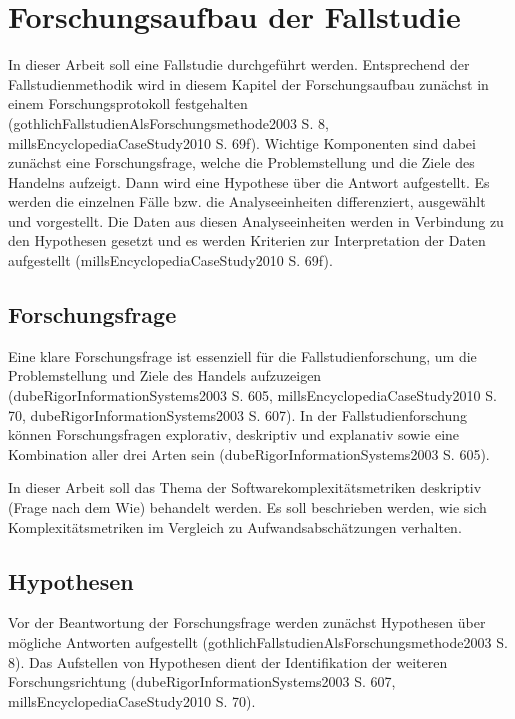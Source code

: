 \chapter{Forschungsaufbau der Fallstudie}\label{forschungsaufbau-der-fallstudie}

In dieser Arbeit soll eine Fallstudie durchgeführt werden. Entsprechend
der Fallstudienmethodik wird in diesem Kapitel der Forschungsaufbau
zunächst in einem Forschungsprotokoll festgehalten
(gothlichFallstudienAlsForschungsmethode2003 S. 8,
millsEncyclopediaCaseStudy2010 S. 69f). Wichtige Komponenten sind dabei
zunächst eine Forschungsfrage, welche die Problemstellung und die Ziele
des Handelns aufzeigt. Dann wird eine Hypothese über die Antwort
aufgestellt. Es werden die einzelnen Fälle bzw. die Analyseeinheiten
differenziert, ausgewählt und vorgestellt. Die Daten aus diesen
Analyseeinheiten werden in Verbindung zu den Hypothesen gesetzt und es
werden Kriterien zur Interpretation der Daten aufgestellt
(millsEncyclopediaCaseStudy2010 S. 69f).

\section{Forschungsfrage}\label{forschungsfrage}

Eine klare Forschungsfrage ist essenziell für die Fallstudienforschung,
um die Problemstellung und Ziele des Handels aufzuzeigen
(dubeRigorInformationSystems2003 S. 605, millsEncyclopediaCaseStudy2010
S. 70, dubeRigorInformationSystems2003 S. 607). In der
Fallstudienforschung können Forschungsfragen explorativ, deskriptiv und
explanativ sowie eine Kombination aller drei Arten sein
(dubeRigorInformationSystems2003 S. 605).

In dieser Arbeit soll das Thema der Softwarekomplexitätsmetriken
deskriptiv (Frage nach dem Wie) behandelt werden. Es soll beschrieben
werden, wie sich Komplexitätsmetriken im Vergleich zu
Aufwandsabschätzungen verhalten.

\section{Hypothesen}\label{hypothesen}

Vor der Beantwortung der Forschungsfrage werden zunächst Hypothesen über
mögliche Antworten aufgestellt
(gothlichFallstudienAlsForschungsmethode2003 S. 8). Das Aufstellen von
Hypothesen dient der Identifikation der weiteren Forschungsrichtung
(dubeRigorInformationSystems2003 S. 607, millsEncyclopediaCaseStudy2010
S. 70).

